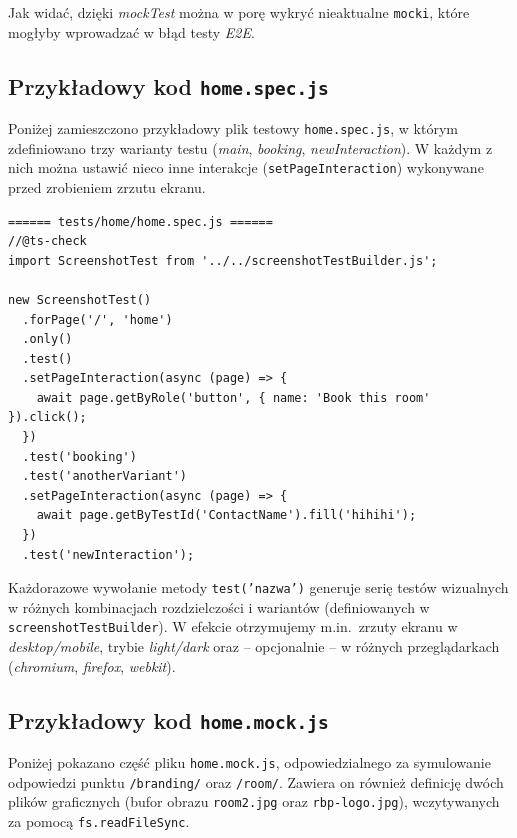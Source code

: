 \documentclass[12pt]{report}
\begin{document}
Jak widać, dzięki \emph{mockTest} można w porę wykryć nieaktualne \texttt{mocki}, które mogłyby wprowadzać w błąd testy \emph{E2E}.

\subsection{Przykładowy kod \texttt{home.spec.js}}
\label{sec:home-spec-code}

Poniżej zamieszczono przykładowy plik testowy \texttt{home.spec.js}, w którym zdefiniowano trzy warianty testu (\emph{main}, \emph{booking}, \emph{newInteraction}). W każdym z nich można ustawić nieco inne interakcje (\texttt{setPageInteraction}) wykonywane przed zrobieniem zrzutu ekranu.

\begin{verbatim}
====== tests/home/home.spec.js ======
//@ts-check
import ScreenshotTest from '../../screenshotTestBuilder.js';

new ScreenshotTest()
  .forPage('/', 'home')
  .only()
  .test()
  .setPageInteraction(async (page) => {
    await page.getByRole('button', { name: 'Book this room' }).click();
  })
  .test('booking')
  .test('anotherVariant')
  .setPageInteraction(async (page) => {
    await page.getByTestId('ContactName').fill('hihihi');
  })
  .test('newInteraction');
\end{verbatim}

\noindent
Każdorazowe wywołanie metody \texttt{test('nazwa')} generuje serię testów wizualnych w różnych kombinacjach rozdzielczości i wariantów (definiowanych w \texttt{screenshotTestBuilder}). W efekcie otrzymujemy m.in.\ zrzuty ekranu w \emph{desktop/mobile}, trybie \emph{light/dark} oraz – opcjonalnie – w różnych przeglądarkach (\emph{chromium}, \emph{firefox}, \emph{webkit}).

\subsection{Przykładowy kod \texttt{home.mock.js}}
\label{sec:home-mock-code}

Poniżej pokazano część pliku \texttt{home.mock.js}, odpowiedzialnego za symulowanie odpowiedzi punktu \texttt{/branding/} oraz \texttt{/room/}. Zawiera on również definicję dwóch plików graficznych (bufor obrazu \texttt{room2.jpg} oraz \texttt{rbp-logo.jpg}), wczytywanych za pomocą \texttt{fs.readFileSync}.
\end{document}
